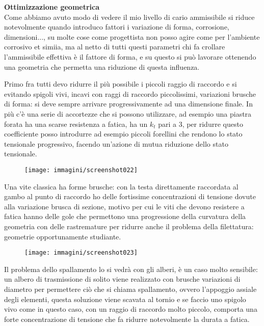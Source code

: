 \documentclass{article}
\begin{document}
		\begin{adjustwidth}{2in}{}
			\textbf{{\LARGE Ottimizzazione geometrica}} \\
			Come abbiamo avuto modo di vedere il mio livello di cario ammissibile si riduce notevolmente quando introduco fattori i variazione di forma, corrosione, dimensioni..., su molte cose come progettista non posso agire come per l'ambiente corrosivo et simiia, ma al netto di tutti questi parametri chi fa crollare l'ammissibile effettiva è il fattore di forma, e su questo si può lavorare ottenendo una geometria che permetta una riduzione di questa influenza. \newline
			
			Primo fra tutti devo ridurre il più possibile i piccoli raggio di raccordo e si evitando spigoli vivi, incavi con raggi di raccordo piccolissimi, variazioni brusche di forma: si deve sempre arrivare progressivamente ad una dimensione finale. In più c'è una serie di accortezze che si possono utilizzare, ad esempio una piastra forata ha una scarse resistenza a fatica, ha un $k_t$ pari a 3, per ridurre questo coefficiente posso introdurre ad esempio piccoli forellini che rendono lo stato tensionale progressivo, facendo un'azione di mutua riduzione dello stato tensionale.
			\begin{figure}[H]
				\centering
				\texttt{[image: immagini/screenshot022]}
				\label{fig:screenshot022}
			\end{figure}						
			Una vite classica ha forme brusche: con la testa direttamente raccordata al gambo al punto di raccordo ho delle fortissime concentrazioni di tensione dovute alla variazione brusca di sezione, motivo per cui le viti che devono resistere a fatica hanno delle gole che permettono una progressione della curvatura della geometria con delle rastremature per ridurre anche il problema della filettatura: geometrie opportunamente studiante. 
			\begin{figure}[H]
				\centering
				\texttt{[image: immagini/screenshot023]}
				\label{fig:screenshot023}
			\end{figure}			
			Il problema dello spallamento lo si vedrà con gli alberi, è un caso molto sensibile: un albero di trasmissione di solito viene realizzato con brusche variazioni di diametro per permettere ciò che si chiama spallamento, ovvero l'appoggio assiale degli elementi, questa soluzione viene scavata al tornio e se faccio uno spigolo vivo come in questo caso, con un raggio di raccordo molto piccolo, comporta una forte concentrazione di tensione che fa ridurre notevolmente la durata a fatica.

\end{adjustwidth}
\end{document}
